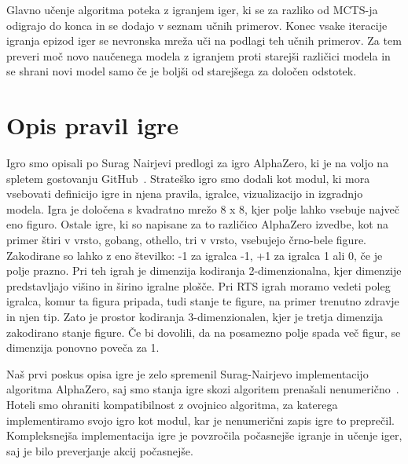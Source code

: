\documentclass[a4paper, 12pt]{book}
\begin{document}
Glavno učenje algoritma poteka z igranjem iger, ki se za razliko od MCTS-ja odigrajo do konca in se dodajo v seznam učnih primerov.
Konec vsake iteracije igranja epizod iger se nevronska mreža uči na podlagi teh učnih primerov.
Za tem preveri moč novo naučenega modela z igranjem proti starejši različici modela in se shrani novi model samo če je boljši od starejšega za določen odstotek.

\chapter{Opis pravil igre}
\label{chpravilaigre}

Igro smo opisali po Surag Nairjevi predlogi za igro AlphaZero, ki je na voljo na spletem gostovanju GitHub~\cite{alphazerogeneral}.
Strateško igro smo dodali kot modul, ki mora vsebovati definicijo igre in njena pravila, igralce, vizualizacijo in izgradnjo modela.
\textsl{}
Igra je določena s kvadratno mrežo 8 x 8, kjer polje lahko vsebuje največ eno figuro.
Ostale igre, ki so napisane za to različico AlphaZero izvedbe, kot na primer štiri v vrsto, gobang, othello, tri v vrsto, vsebujejo črno-bele figure.
Zakodirane so lahko z eno številko: -1 za igralca -1, +1 za igralca 1 ali 0, če je polje prazno.
Pri teh igrah je dimenzija kodiranja 2-dimenzionalna, kjer dimenzije predstavljajo višino in širino igralne plošče.
Pri RTS igrah moramo vedeti poleg igralca, komur ta figura pripada, tudi stanje te figure, na primer trenutno zdravje in njen tip.
Zato je prostor kodiranja 3-dimenzionalen, kjer je tretja dimenzija zakodirano stanje figure.
Če bi dovolili, da na posamezno polje spada več figur, se dimenzija ponovno poveča za 1.

Naš prvi poskus opisa igre je zelo spremenil Surag-Nairjevo implementacijo algoritma AlphaZero, saj smo stanja igre skozi algoritem prenašali nenumerično~\cite{objectAlphaZero}.
Hoteli smo ohraniti kompatibilnost z ovojnico algoritma, za katerega implementiramo svojo igro kot modul, kar je nenumerični zapis igre to preprečil.
Kompleksnejša implementacija igre je povzročila počasnejše igranje in učenje iger, saj je bilo preverjanje akcij počasnejše.
\end{document}

